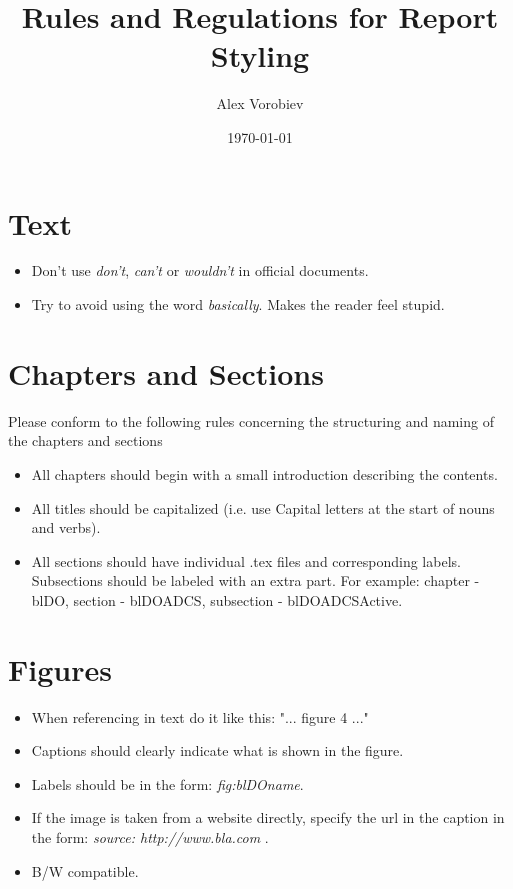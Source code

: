 \documentclass[11pt, a4paper ]{article}
\begin{document}
\title{Rules and Regulations for Report Styling}
\author{Alex Vorobiev}
\date{\today}
\maketitle

\section{Text}
\begin{itemize}
	\item Don't use \emph{don't}, \emph{can't} or \emph{wouldn't} in official documents.
	\item Try to avoid using the word \emph{basically}. Makes the reader feel stupid.
\end{itemize}

\section{Chapters and Sections}
Please conform to the following rules concerning the structuring and naming of the chapters and sections
\begin{itemize}
	\item All chapters should begin with a small introduction describing the contents.
	\item All titles should be capitalized (i.e. use Capital letters at the start of nouns and verbs).
	\item All sections should have individual .tex files and corresponding labels. Subsections should be labeled with an extra part. For example: chapter - blDO, section - blDOADCS, subsection - blDOADCSActive.
\end{itemize}
\section{Figures}
\begin{itemize}
	\item When referencing in text do it like this: "... figure 4 ..."
	\item Captions should clearly indicate what is shown in the figure.
	\item Labels should be in the form: \emph{fig:blDOname}.
	\item If the image is taken from a website directly, specify the url in the caption in the form: \emph{source: http://www.bla.com }.
	\item B/W compatible.
\end{itemize}
\end{document}
